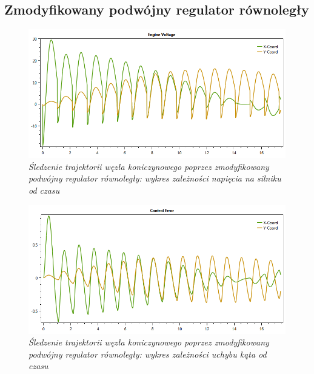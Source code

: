 \documentclass[12pt, oneside]{report}
\theoremstyle{definition}
\begin{document}
\begin{appendices}
\section{Zmodyfikowany podwójny regulator równoległy}
\begin{figure}[H]
	\centering
		\includegraphics[width = 400pt]{TrefoilKnotPDEV} 
		\caption{\textit{Śledzenie trajektorii węzła koniczynowego poprzez zmodyfikowany podwójny regulator równoległy: wykres zależności napięcia na silniku od czasu}}
		\label{plot:TrefoilKnotPDEV}
\end{figure}

\begin{figure}[H]
	\centering
		\includegraphics[width = 400pt]{TrefoilKnotPDCE} 
		\caption{\textit{Śledzenie trajektorii węzła koniczynowego poprzez zmodyfikowany podwójny regulator równoległy: wykres zależności uchybu kąta od czasu}}
		\label{plot:TrefoilKnotPDCE}
\end{figure}


\end{appendices}
\end{document}
